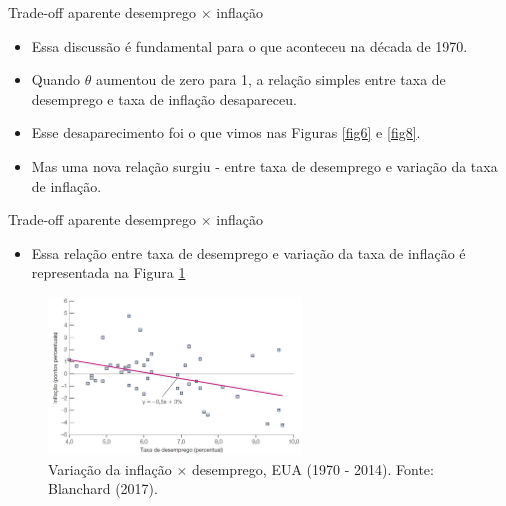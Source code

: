 \documentclass[10pt]{beamer}
\begin{document}
\begin{frame}{Trade-off aparente desemprego $\times$ inflação}
    \begin{itemize}
        \item Essa discussão é fundamental para o que aconteceu na década de 1970.
        \bigskip
        \item Quando $\theta$ aumentou de zero para 1, a relação simples entre taxa de desemprego e taxa de inflação desapareceu.
        \bigskip
        \item Esse desaparecimento foi o que vimos nas Figuras \ref{fig6} e \ref{fig8}.
        \bigskip
        \item Mas uma nova relação surgiu - entre taxa de desemprego e variação da taxa de inflação.
    \end{itemize}
\end{frame}

\begin{frame}{Trade-off aparente desemprego $\times$ inflação}
    \begin{itemize}
        \item Essa relação entre taxa de desemprego e variação da taxa de inflação é representada na Figura \ref{fig9}
    \end{itemize}
    \begin{figure}
        \centering
        \includegraphics[width = 0.6\textwidth]{./figures/aula13_fig9.JPG}
        \caption{Variação da inflação $\times$ desemprego, EUA (1970 - 2014). Fonte: Blanchard (2017).}
        \label{fig9}
    \end{figure}
\end{frame}
\end{document}
